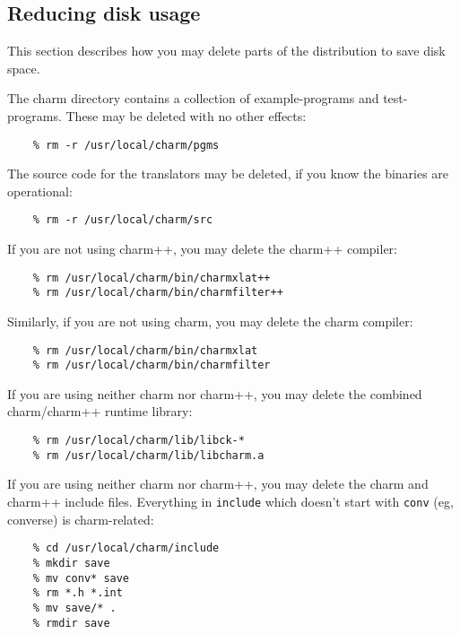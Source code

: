 \subsection{Reducing disk usage}

This section describes how you may delete parts of the distribution to
save disk space.  

The charm directory contains a collection of example-programs and
test-programs.  These may be deleted with no other effects:

\begin{verbatim}
    % rm -r /usr/local/charm/pgms
\end{verbatim}

The source code for the translators may be deleted, if you know the
binaries are operational:

\begin{verbatim}
    % rm -r /usr/local/charm/src
\end{verbatim}

If you are not using charm++, you may delete the charm++ compiler:

\begin{verbatim}
    % rm /usr/local/charm/bin/charmxlat++
    % rm /usr/local/charm/bin/charmfilter++
\end{verbatim}

Similarly, if you are not using charm, you may delete the charm compiler:

\begin{verbatim}
    % rm /usr/local/charm/bin/charmxlat
    % rm /usr/local/charm/bin/charmfilter
\end{verbatim}

If you are using neither charm nor charm++, you may delete the
combined charm/charm++ runtime library:

\begin{verbatim}
    % rm /usr/local/charm/lib/libck-*
    % rm /usr/local/charm/lib/libcharm.a
\end{verbatim}

If you are using neither charm nor charm++, you may delete the charm
and charm++ include files.  Everything in {\tt include} which doesn't
start with {\tt conv} (eg, converse) is charm-related:

\begin{verbatim}
    % cd /usr/local/charm/include
    % mkdir save
    % mv conv* save
    % rm *.h *.int
    % mv save/* .
    % rmdir save
\end{verbatim}

